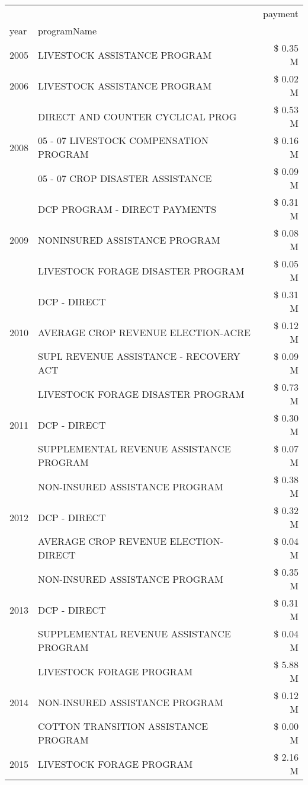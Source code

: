 \begin{tabular}{llr}
\toprule
 &  & payment \\
year & programName &  \\
\midrule
2005 & LIVESTOCK ASSISTANCE PROGRAM & \$ 0.35 M \\
\cline{1-3}
2006 & LIVESTOCK ASSISTANCE PROGRAM & \$ 0.02 M \\
\cline{1-3}
\multirow[t]{3}{*}{2008} & DIRECT AND COUNTER CYCLICAL PROG & \$ 0.53 M \\
 & 05 - 07 LIVESTOCK COMPENSATION PROGRAM & \$ 0.16 M \\
 & 05 - 07 CROP DISASTER ASSISTANCE & \$ 0.09 M \\
\cline{1-3}
\multirow[t]{3}{*}{2009} & DCP PROGRAM - DIRECT PAYMENTS & \$ 0.31 M \\
 & NONINSURED ASSISTANCE PROGRAM & \$ 0.08 M \\
 & LIVESTOCK FORAGE DISASTER  PROGRAM & \$ 0.05 M \\
\cline{1-3}
\multirow[t]{3}{*}{2010} & DCP - DIRECT & \$ 0.31 M \\
 & AVERAGE CROP REVENUE ELECTION-ACRE & \$ 0.12 M \\
 & SUPL REVENUE ASSISTANCE - RECOVERY ACT & \$ 0.09 M \\
\cline{1-3}
\multirow[t]{3}{*}{2011} & LIVESTOCK FORAGE DISASTER PROGRAM & \$ 0.73 M \\
 & DCP - DIRECT & \$ 0.30 M \\
 & SUPPLEMENTAL REVENUE ASSISTANCE PROGRAM & \$ 0.07 M \\
\cline{1-3}
\multirow[t]{3}{*}{2012} & NON-INSURED ASSISTANCE PROGRAM & \$ 0.38 M \\
 & DCP - DIRECT & \$ 0.32 M \\
 & AVERAGE CROP REVENUE ELECTION-DIRECT & \$ 0.04 M \\
\cline{1-3}
\multirow[t]{3}{*}{2013} & NON-INSURED ASSISTANCE PROGRAM & \$ 0.35 M \\
 & DCP - DIRECT & \$ 0.31 M \\
 & SUPPLEMENTAL REVENUE ASSISTANCE PROGRAM & \$ 0.04 M \\
\cline{1-3}
\multirow[t]{3}{*}{2014} & LIVESTOCK FORAGE PROGRAM & \$ 5.88 M \\
 & NON-INSURED ASSISTANCE PROGRAM & \$ 0.12 M \\
 & COTTON TRANSITION ASSISTANCE PROGRAM & \$ 0.00 M \\
\cline{1-3}
\multirow[t]{3}{*}{2015} & LIVESTOCK FORAGE PROGRAM & \$ 2.16 M \\

\end{tabular}
